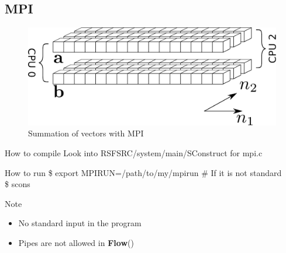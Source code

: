 \subsection{MPI}

\begin{frame}
  \vspace{1.0cm}
  \begin{figure}
  \includegraphics[scale=0.55]{Fig/abcmpi.pdf}
  \caption{Summation of vectors with MPI}
  \end{figure}
\end{frame}

\begin{frame}
\end{frame}
\begin{frame}
\end{frame}
\begin{frame}
\end{frame}
\begin{frame}
\end{frame}

\begin{frame}
  \begin{block}{How to compile}
    Look into RSFSRC/system/main/SConstruct for mpi.c 
  \end{block}
  \begin{block}{How to run}
    \$ export MPIRUN=/path/to/my/mpirun \# If it is not standard \\
    \$ scons
  \end{block}
  \begin{block}{Note}
    \begin{itemize}
      \item No standard input in the program
      \item Pipes are not allowed in {\bf Flow}()
    \end{itemize}
  \end{block}
\end{frame}

